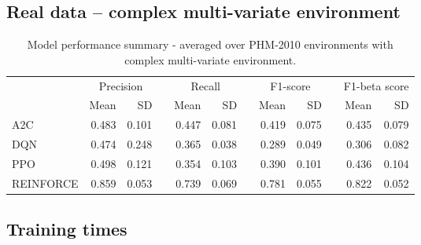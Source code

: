 \documentclass[a4paper, 12pt]{article}
\newcommand{\rowspace}[1]{\renewcommand{\arraystretch}{#1}}
\begin{document}
\subsection{Real data -- complex multi-variate environment}
\begin{table}[hbt!]\centering
	\sffamily
	\rowspace{1.3}
	\begin{tabular}{@{}l rr c rr c rr c rr@{}}
		\arrayrulecolor{black!40}\toprule
		& \multicolumn{2}{c}{Precision} & \phantom{i} & \multicolumn{2}{c}{Recall} & \phantom{i} & \multicolumn{2}{c}{F1-score} & \phantom{i} & \multicolumn{2}{c}{F1-beta score} \\
		\cmidrule{2-3} \cmidrule{5-6} \cmidrule{8-9} \cmidrule{11-12} 
		
		&Mean &SD & &Mean &SD & &Mean &SD& &Mean & SD\\ \midrule
		A2C & 0.483 & 0.101 & &0.447 & 0.081 & & 0.419 & 0.075 & &0.435 &0.079 \\
		DQN & 0.474 & 0.248 & &0.365 & 0.038 & & 0.289 & 0.049 & &0.306 &0.082 \\
		PPO & 0.498 & 0.121 & &0.354 & 0.103 & & 0.390 & 0.101 & &0.436 &0.104 \\
		REINFORCE & 0.859 & 0.053 & &0.739 & 0.069 & & 0.781 & 0.055 & &0.822 &0.052 \\
		\bottomrule
	\end{tabular}
	\caption{Model performance summary - averaged over PHM-2010 environments with complex multi-variate environment.}
	\label{tbl:PHMMS}
\end{table}

\subsection{Training times}
\end{document}
